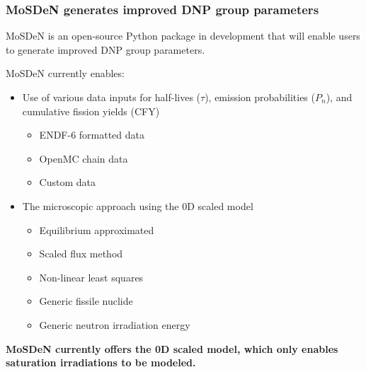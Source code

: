 \begin{frame}
	\frametitle{MoSDeN generates improved \gls{DNP} group parameters}
	\Gls{MoSDeN} is an open-source Python package in development that will enable users to generate improved \gls{DNP} group parameters.
	\begin{block}{MoSDeN currently enables:}
		\begin{itemize}
			\item Use of various data inputs for half-lives ($\tau$), emission probabilities ($P_n$), and cumulative fission yields (CFY)
			\begin{itemize}
				\item ENDF-6 formatted data
				\item OpenMC chain data
				\item Custom data
			\end{itemize}
			\item The microscopic approach using the 0D scaled model
			\begin{itemize}
				\item Equilibrium approximated
				\item Scaled flux method
				\item Non-linear least squares
				\item Generic fissile nuclide
				\item Generic neutron irradiation energy
			\end{itemize}
		\end{itemize}
	\end{block}

	\textbf{\Gls{MoSDeN} currently offers the 0D scaled model, which only enables saturation irradiations to be modeled.} 

\end{frame}
